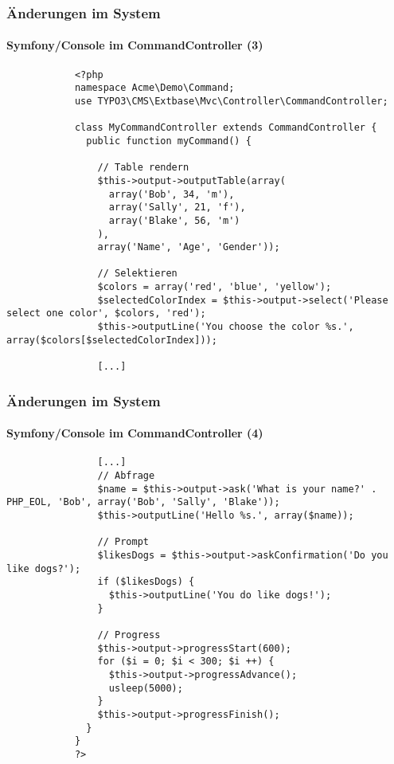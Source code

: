 \begin{frame}[fragile]
	\frametitle{Änderungen im System}
	\framesubtitle{Symfony/Console im CommandController (3)}

	\lstset{basicstyle=\tiny\ttfamily}

		\begin{lstlisting}
			<?php
			namespace Acme\Demo\Command;
			use TYPO3\CMS\Extbase\Mvc\Controller\CommandController;

			class MyCommandController extends CommandController {
			  public function myCommand() {

			    // Table rendern
			    $this->output->outputTable(array(
			      array('Bob', 34, 'm'),
			      array('Sally', 21, 'f'),
			      array('Blake', 56, 'm')
			    ),
			    array('Name', 'Age', 'Gender'));

			    // Selektieren
			    $colors = array('red', 'blue', 'yellow');
			    $selectedColorIndex = $this->output->select('Please select one color', $colors, 'red');
			    $this->outputLine('You choose the color %s.', array($colors[$selectedColorIndex]));

			    [...]
		\end{lstlisting}

\end{frame}


\begin{frame}[fragile]
	\frametitle{Änderungen im System}
	\framesubtitle{Symfony/Console im CommandController (4)}

	\lstset{basicstyle=\tiny\ttfamily}

		\begin{lstlisting}
			    [...]
			    // Abfrage
			    $name = $this->output->ask('What is your name?' . PHP_EOL, 'Bob', array('Bob', 'Sally', 'Blake'));
			    $this->outputLine('Hello %s.', array($name));

			    // Prompt
			    $likesDogs = $this->output->askConfirmation('Do you like dogs?');
			    if ($likesDogs) {
			      $this->outputLine('You do like dogs!');
			    }

			    // Progress
			    $this->output->progressStart(600);
			    for ($i = 0; $i < 300; $i ++) {
			      $this->output->progressAdvance();
			      usleep(5000);
			    }
			    $this->output->progressFinish();
			  }
			}
			?>
		\end{lstlisting}

\end{frame}


